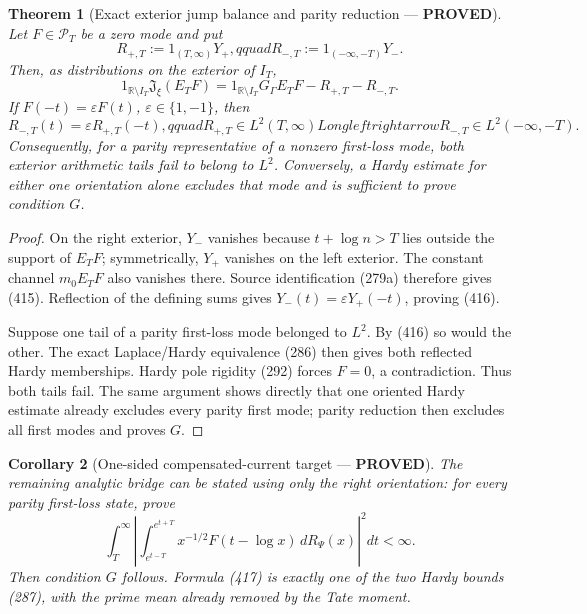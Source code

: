 \documentclass[11pt]{article}
\newtheorem{theorem}{Theorem}
\newtheorem{corollary}[theorem]{Corollary}
\newcommand{\PROVED}{\textcolor{green!45!black}{\textbf{PROVED}}}
\begin{document}
\begin{theorem}[Exact exterior jump balance and parity reduction ---
\PROVED]
Let $F\in\mathcal P_T$ be a zero mode and put
\begin{equation}
 R_{+,T}:=1_{(T,\infty)}Y_+,qquad
 R_{-,T}:=1_{(-\infty,-T)}Y_- .                     \tag{414}
\end{equation}
Then, as distributions on the exterior of $I_T$,
\begin{equation}
 1_{\mathbb R\setminus I_T}\mathfrak J_\xi(E_TF)
 =1_{\mathbb R\setminus I_T}G_\Gamma E_TF
  -R_{+,T}-R_{-,T}.                                  \tag{415}
\end{equation}
If $F(-t)=\varepsilon F(t)$, $\varepsilon\in\{1,-1\}$, then
\begin{equation}
 R_{-,T}(t)=\varepsilon R_{+,T}(-t),qquad
 R_{+,T}\in L^2(T,\infty)Longleftrightarrow
 R_{-,T}\in L^2(-\infty,-T).                        \tag{416}
\end{equation}
Consequently, for a parity representative of a nonzero first-loss mode,
both exterior arithmetic tails fail to belong to $L^2$.  Conversely, a
Hardy estimate for either one orientation alone excludes that mode and is
sufficient to prove condition $G$.
\end{theorem}

\begin{proof}
On the right exterior, $Y_-$ vanishes because
$t+\log n>T$ lies outside the support of $E_TF$; symmetrically, $Y_+$
vanishes on the left exterior.  The constant channel $m_0E_TF$ also
vanishes there.  Source identification (279a) therefore gives (415).
Reflection of the defining sums gives
$Y_-(t)=\varepsilon Y_+(-t)$, proving (416).

Suppose one tail of a parity first-loss mode belonged to $L^2$.  By (416)
so would the other.  The exact Laplace/Hardy equivalence (286) then gives
both reflected Hardy memberships.  Hardy pole rigidity (292) forces
$F=0$, a contradiction.  Thus both tails fail.  The same argument shows
directly that one oriented Hardy estimate already excludes every parity
first mode; parity reduction then excludes all first modes and proves $G$.
\end{proof}

\begin{corollary}[One-sided compensated-current target --- \PROVED]
The remaining analytic bridge can be stated using only the right
orientation: for every parity first-loss state, prove
\begin{equation}
 \int_T^\infty\left|
 \int_{e^{t-T}}^{e^{t+T}}
 x^{-1/2}F(t-\log x)\,dR_\Psi(x)
 \right|^2dt<\infty.                                \tag{417}
\end{equation}
Then condition $G$ follows.  Formula (417) is exactly one of the two Hardy
bounds (287), with the prime mean already removed by the Tate moment.
\end{corollary}
\end{document}
